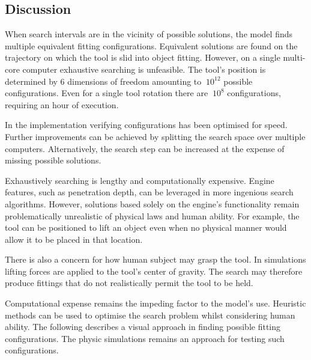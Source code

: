 \documentclass[11]{article}
\begin{document}
\subsection{Discussion}
When search intervals are in the vicinity of possible solutions, the model finds multiple equivalent fitting configurations.
Equivalent solutions are found on the trajectory on which the tool is slid into object fitting.
However, on a single multi-core computer exhaustive searching is unfeasible. 
The tool's position is determined by 6 dimensions of freedom amounting to $~10^{12}$ possible configurations. 
Even for a single tool rotation there are $~10^8$ configurations, requiring an hour of execution. 

In the implementation verifying configurations has been optimised for speed.
Further improvements can be achieved by splitting the search space over multiple computers.
Alternatively, the search step can be increased at the expense of missing possible solutions. 

Exhaustively searching is lengthy and computationally expensive.
Engine features, such as penetration depth, can be leveraged in more ingenious search algorithms.
However, solutions based solely on the engine's functionality remain problematically unrealistic of physical laws and human ability.
For example, the tool can be positioned to lift an object even when no physical manner would allow it to be placed in that location.  

There is also a concern for how human subject may grasp the tool.
In simulations lifting forces are applied to the tool's center of gravity.
The search may therefore produce fittings that do not realistically permit the tool to be held.

Computational expense remains the impeding factor to the model's use. 
Heuristic methods can be used to optimise the search problem whilst considering human ability.
The following describes a visual approach in finding possible fitting configurations. 
The physic simulations remains an approach for testing such configurations. 

\printbibliography
\end{document}
